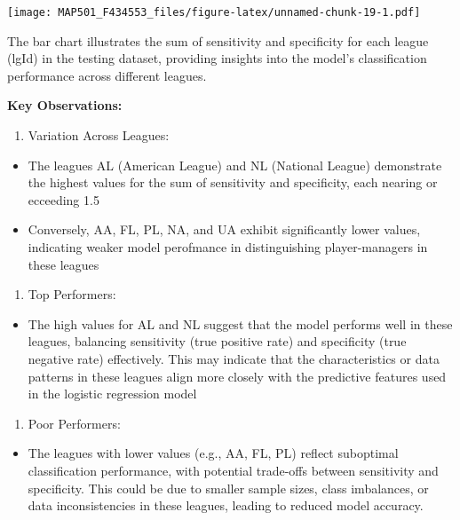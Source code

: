 \documentclass[
]{article}
\providecommand{\tightlist}{%
  \setlength{\itemsep}{0pt}\setlength{\parskip}{0pt}}
\begin{document}
\texttt{[image: MAP501\_F434553\_files/figure-latex/unnamed-chunk-19-1.pdf]}

The bar chart illustrates the sum of sensitivity and specificity for
each league (lgId) in the testing dataset, providing insights into the
model's classification performance across different leagues.

\textbf{Key Observations:}

\begin{enumerate}
\def\labelenumi{\arabic{enumi}.}
\tightlist
\item
  Variation Across Leagues:
\end{enumerate}

\begin{itemize}
\item
  The leagues AL (American League) and NL (National League) demonstrate
  the highest values for the sum of sensitivity and specificity, each
  nearing or ecceeding 1.5
\item
  Conversely, AA, FL, PL, NA, and UA exhibit significantly lower values,
  indicating weaker model perofmance in distinguishing player-managers
  in these leagues
\end{itemize}

\begin{enumerate}
\def\labelenumi{\arabic{enumi}.}
\setcounter{enumi}{1}
\tightlist
\item
  Top Performers:
\end{enumerate}

\begin{itemize}
\tightlist
\item
  The high values for AL and NL suggest that the model performs well in
  these leagues, balancing sensitivity (true positive rate) and
  specificity (true negative rate) effectively. This may indicate that
  the characteristics or data patterns in these leagues align more
  closely with the predictive features used in the logistic regression
  model
\end{itemize}

\begin{enumerate}
\def\labelenumi{\arabic{enumi}.}
\setcounter{enumi}{2}
\tightlist
\item
  Poor Performers:
\end{enumerate}

\begin{itemize}
\tightlist
\item
  The leagues with lower values (e.g., AA, FL, PL) reflect suboptimal
  classification performance, with potential trade-offs between
  sensitivity and specificity. This could be due to smaller sample
  sizes, class imbalances, or data inconsistencies in these leagues,
  leading to reduced model accuracy.
\end{itemize}
\end{document}
